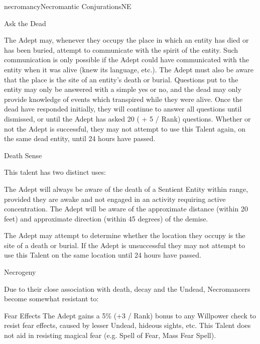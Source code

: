 \begin{College}[1.1]{necromancy}{Necromantic Conjurations}{NE}
\begin{talent}[T-1]{Ask the Dead}
\begin{effects}
The Adept may, whenever they occupy the place in which an entity has
died or has been buried, attempt to communicate with the spirit of the
entity.  Such communication is only possible if the Adept could have
communicated with the entity when it was alive (knew its language,
etc.).  The Adept must also be aware that the place is the site of an
entity’s death or burial. Questions put to the entity may only be
answered with a simple yes or no, and the dead may only provide
knowledge of events which transpired while they were alive.  Once the
dead have responded initially, they will continue to answer all
questions until dismissed, or until the Adept has asked 20 ( + 5 /
Rank) questions. Whether or not the Adept is successful, they may not
attempt to use this Talent again, on the same dead entity, until 24
hours have passed.
\end{effects}
\end{talent}

\begin{talent}[T-2]{Death Sense}
\begin{effects}
This talent has two distinct uses: 
\begin{Enumerate}
\item The Adept will always be aware of the death of a Sentient Entity
  within range, provided they are awake and not engaged in an activity
  requiring active concentration.  The Adept will be aware of the
  approximate distance (within 20 feet) and approximate direction
  (within 45 degrees) of the demise.

\item The Adept may attempt to determine whether the location they
  occupy is the site of a death or burial.  If the Adept is
  unsuccessful they may not attempt to use this Talent on the same
  location until 24 hours have passed.
\end{Enumerate}
\end{effects}
\end{talent}

\begin{talent}[T-3]{Necrogeny}

\begin{effects}
Due to their close association with death, decay and the Undead,
Necromancers become somewhat resistant to:
\begin{Description}
\item[Fear Effects] The Adept gains a 5\% (+3 / Rank) bonus to any
  Willpower check to resist fear effects, caused by lesser Undead,
  hideous sights, etc.  This Talent does not aid in resisting magical
  fear (e.g.  Spell of Fear, Mass Fear Spell).


\end{Description}
\end{effects}
\end{talent}
\end{College}
